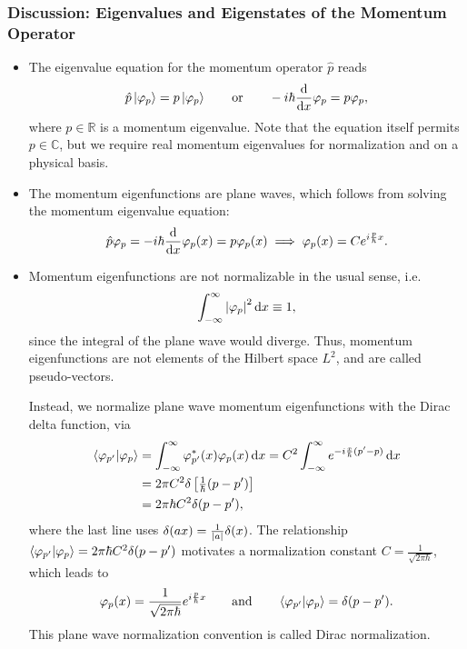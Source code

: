 \documentclass[11pt, a4paper]{article}
\newcommand{\diff}{\mathop{}\!\mathrm{d}} %
\begin{document}
\subsubsection{Discussion: Eigenvalues and Eigenstates of the Momentum Operator} \label{sss:momentum-eigenstates}
\begin{itemize}

    \item The eigenvalue equation for the momentum operator $ \hat{p} $ reads
    \begin{equation*}
        \hat{p} \ket{\varphi_{p}} = p \ket{\varphi_{p}} \qquad \text{or} \qquad -i \hbar \dv{x} \varphi_{p} = p \varphi_{p},
    \end{equation*}
    where $ p \in \mathbb{R} $ is a momentum eigenvalue. Note that the equation itself permits $ p \in \mathbb{C} $, but we require real momentum eigenvalues for normalization and on a physical basis. 

    \item The momentum eigenfunctions are plane waves, which follows from solving the momentum eigenvalue equation:
    \begin{equation*}
        \hat{p}\varphi_{p} = - i \hbar \dv{x} \varphi_{p}(x) = p\varphi_{p}(x) \implies \varphi_{p}(x) = C e^{i \frac{p}{\hbar}x}.
    \end{equation*}
    
    \item Momentum eigenfunctions are not normalizable in the usual sense, i.e.
    \begin{equation*}
       \int_{-\infty}^{\infty} \abs{\varphi_{p}}^{2}\diff x \equiv 1,
    \end{equation*}
    since the integral of the plane wave would diverge. Thus, momentum eigenfunctions are not elements of the Hilbert space $ L^{2} $, and are called pseudo-vectors.

    Instead, we normalize plane wave momentum eigenfunctions with the Dirac delta function, via
    \begin{align*}
        \braket{\varphi_{p'}}{\varphi_{p}} & =  \int_{-\infty}^{\infty}\varphi^{*}_{p'}(x) \varphi_{p}(x) \diff x = C^{2} \int_{-\infty}^{\infty} e^{-i \frac{x}{\hbar}(p' - p)}\diff x\\
        & = 2\pi C^{2} \delta \left[ \tfrac{1}{\hbar} (p - p') \right] \\
        & = 2 \pi \hbar C^{2} \delta(p - p'),
    \end{align*}
    where the last line uses $ \delta(ax) = \frac{1}{\abs{a}} \delta(x) $. The relationship $ \braket{\varphi_{p'}}{\varphi_{p}} = 2 \pi \hbar C^{2} \delta(p - p') $ motivates a normalization constant $ C = \frac{1}{\sqrt{2\pi \hbar}} $, which leads to
    \begin{equation*}
        \varphi_{p}(x) = \frac{1}{\sqrt{2\pi \hbar}} e^{i \frac{p}{\hbar}x} \qquad \text{and} \qquad \braket{\varphi_{p'}}{\varphi_{p}} = \delta(p - p').
    \end{equation*}
    This plane wave normalization convention is called Dirac normalization.
    

\end{itemize}
\end{document}
